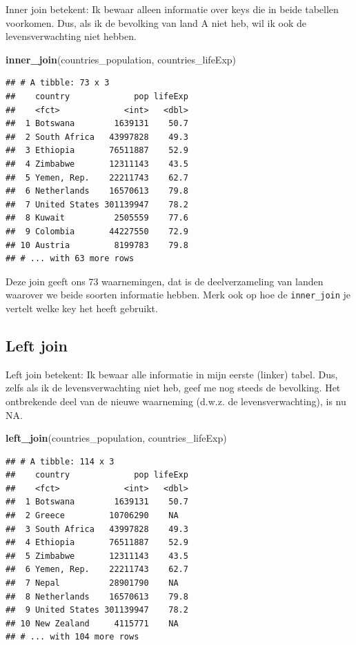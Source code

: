 \documentclass[]{tufte-book}
\newenvironment{Shaded}{}{}
\newcommand{\KeywordTok}[1]{\textcolor[rgb]{0.00,0.44,0.13}{\textbf{#1}}}
\newcommand{\NormalTok}[1]{#1}
\begin{document}
Inner join betekent: Ik bewaar alleen informatie over keys die in beide tabellen voorkomen. Dus, als ik de bevolking van land A niet heb, wil ik ook de levensverwachting niet hebben.

\begin{Shaded}
\begin{Highlighting}[]
\KeywordTok{inner_join}\NormalTok{(countries_population, countries_lifeExp)}
\end{Highlighting}
\end{Shaded}

\begin{verbatim}
## # A tibble: 73 x 3
##    country             pop lifeExp
##    <fct>             <int>   <dbl>
##  1 Botswana        1639131    50.7
##  2 South Africa   43997828    49.3
##  3 Ethiopia       76511887    52.9
##  4 Zimbabwe       12311143    43.5
##  5 Yemen, Rep.    22211743    62.7
##  6 Netherlands    16570613    79.8
##  7 United States 301139947    78.2
##  8 Kuwait          2505559    77.6
##  9 Colombia       44227550    72.9
## 10 Austria         8199783    79.8
## # ... with 63 more rows
\end{verbatim}

Deze join geeft ons 73 waarnemingen, dat is de deelverzameling van landen waarover we beide soorten informatie hebben. Merk ook op hoe de \texttt{inner\_join} je vertelt welke key het heeft gebruikt.

\hypertarget{left-join}{%
\subsection{Left join}\label{left-join}}

Left join betekent: Ik bewaar alle informatie in mijn eerste (linker) tabel. Dus, zelfs als ik de levensverwachting niet heb, geef me nog steeds de bevolking. Het ontbrekende deel van de nieuwe waarneming (d.w.z. de levensverwachting), is nu NA.

\begin{Shaded}
\begin{Highlighting}[]
\KeywordTok{left_join}\NormalTok{(countries_population, countries_lifeExp)}
\end{Highlighting}
\end{Shaded}

\begin{verbatim}
## # A tibble: 114 x 3
##    country             pop lifeExp
##    <fct>             <int>   <dbl>
##  1 Botswana        1639131    50.7
##  2 Greece         10706290    NA  
##  3 South Africa   43997828    49.3
##  4 Ethiopia       76511887    52.9
##  5 Zimbabwe       12311143    43.5
##  6 Yemen, Rep.    22211743    62.7
##  7 Nepal          28901790    NA  
##  8 Netherlands    16570613    79.8
##  9 United States 301139947    78.2
## 10 New Zealand     4115771    NA  
## # ... with 104 more rows
\end{verbatim}
\end{document}
